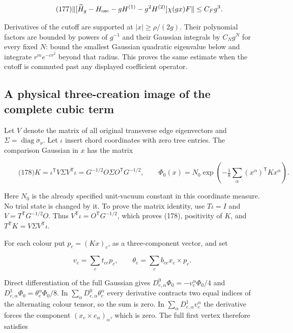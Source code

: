 \[
\qquad\text{(177)}
 \|[\widetilde H_g-H_{\rm osc}-gH^{(1)}-g^2H^{(2)}]
                       \chi(gx)F\|\le C_F g^3.
\]

Derivatives of the cutoff are supported at \(|x|\ge\rho/(2g)\). Their
polynomial factors are bounded by powers of \(g^{-1}\) and their
Gaussian integrals by \(C_Ng^N\) for every fixed \(N\): bound the
smallest Gaussian quadratic eigenvalue below and integrate
\(r^m e^{-cr^2}\) beyond that radius. This proves the same estimate when
the cutoff is commuted past any displayed coefficient operator.

\subsection{A physical three-creation image of the complete cubic
term}\label{nonabelian-vertex-md-a-physical-three-creation-image-of-the-complete-cubic-term}

Let \(V\) denote the matrix of all original transverse edge eigenvectors
and \(\Sigma=\operatorname{diag}\sigma_\nu\). Let \(\iota\) insert chord
coordinates with zero tree entries. The comparison Gaussian in \(x\) has
the matrix

\[
\qquad\text{(178)}
 K=\iota^{\mathsf T}V\Sigma V^{\mathsf T}\iota
   =G^{-1/2}O\Sigma O^{\mathsf T}G^{-1/2},\qquad
 \Phi_0(x)=N_0\exp\left(-\tfrac18\sum_\alpha(x^\alpha)^{\mathsf T}Kx^\alpha\right).
\]

Here \(N_0\) is the already specified unit-vacuum constant in this
coordinate measure. No trial state is changed by it. To prove the matrix
identity, use \(T\iota=I\) and \(V=T^{\mathsf T}G^{-1/2}O\). Thus
\(V^{\mathsf T}\iota=O^{\mathsf T}G^{-1/2}\), which proves (178),
positivity of \(K\), and \(T^{\mathsf T}K=V\Sigma V^{\mathsf T}\iota\).

For each colour put \(p_c=(Kx)_c\), as a three-component vector, and set

\[
v_e=\sum_c t_{ce}p_c,\qquad
 \theta_e=\sum_c b_{ce}x_c\times p_c.
\]

Direct differentiation of the full Gaussian gives
\(D^0_{e,\alpha}\Phi_0=-v_e^\alpha\Phi_0/4\) and
\(D^1_{e,\alpha}\Phi_0=\theta_e^\alpha\Phi_0/8\). In
\(\sum_\alpha D^0_{e,\alpha}\theta_e^\alpha\) every derivative contracts
two equal indices of the alternating colour tensor, so the sum is zero.
In \(\sum_\alpha D^1_{e,\alpha}v_e^\alpha\) the derivative forces the
component \((x_c\times e_\alpha)_\alpha\), which is zero. The full first
vertex therefore satisfies

